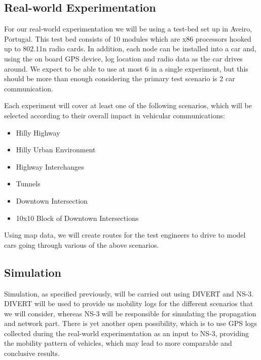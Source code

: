 \documentclass[11pt,letter]{article}
\begin{document}
\subsection{Real-world Experimentation}
For our real-world experimentation we will be using a test-bed set up in
Aveiro, Portugal. This test bed consists of 10 modules which are x86
processors hooked up to 802.11n radio cards. In addition, each node can
be installed into a car and, using the on board GPS device, log location
and radio data as the car drives around. We expect to be able to use at
most 6 in a single experiment, but this should be more than enough
considering the primary test scenario is 2 car communication.

Each experiment will cover at least one of the following scenarios, which will be selected according to their overall impact in vehicular communications:
\begin{itemize}\itemsep2pt
	\item Hilly Highway
	\item Hilly Urban Environment
	\item Highway Interchanges
	\item Tunnels
	\item Downtown Intersection
	\item 10x10 Block of Downtown Intersections
\end{itemize}

Using map data, we will create routes for the test engineers to drive to
model cars going through various of the above scenarios.

\subsection{Simulation}
Simulation, as specified previously, will be carried out using DIVERT and NS-3. DIVERT will be used to provide us mobility logs for the different scenarios that we will consider, whereas NS-3 will be responsible for simulating the propagation and network part. There is yet another open possibility, which is to use GPS logs collected during the real-world experimentation as an input to NS-3, providing the mobility pattern of vehicles, which may lead to more comparable and conclusive results.



\end{document}
